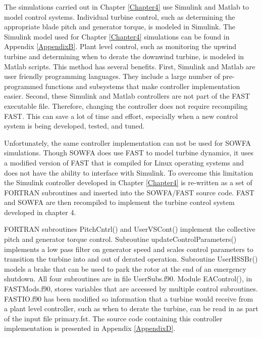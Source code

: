 The simulations carried out in Chapter \ref{Chapter4} use Simulink and Matlab to model control systems. Individual turbine control, such as determining the appropriate blade pitch and generator torque, is modeled in Simulink. The Simulink model used for Chapter \ref{Chapter4} simulations can be found in Appendix \ref{AppendixB}. Plant level control, such as monitoring the upwind turbine and determining when to derate the downwind turbine, is modeled in Matlab scripts. This method has several benefits. First, Simulink and Matlab are user friendly programming languages.  They include a large number of pre-programmed functions and subsystems that make controller implementation easier. Second, these Simulink and Matlab controllers are not part of the FAST executable file. Therefore, changing the controller does not require recompiling FAST. This can save a lot of time and effort, especially when a new control system is being developed, tested, and tuned. 

Unfortunately, the same controller implementation can not be used for SOWFA simulations. Though SOWFA does use FAST to model turbine dynamics, it uses a modified version of FAST that is compiled for Linux operating systems and does not have the ability to interface with Simulink. To overcome this limitation the Simulink controller developed in Chapter \ref{Chapter4} is re-written as a set of FORTRAN subroutines and inserted into the SOWFA/FAST source code. FAST and SOWFA are then recompiled to implement the turbine control system developed in chapter 4. 

FORTRAN subroutines PitchCntrl() and UserVSCont() implement the collective pitch and generator torque control. Subroutine updateControlParameters() implements a low pass filter on generator speed and scales control parameters to transition the turbine into and out of derated operation. Subroutine UserHSSBr() models a brake that can be used to park the rotor at the end of an emergency shutdown. All four subroutines are in file UserSubs.f90. Module EAControl(), in FAST\textunderscore Mods.f90, stores variables that are accessed by multiple control subroutines. FAST\textunderscore IO.f90 has been modified so information that a turbine would receive from a plant level controller, such as when to derate the turbine, can be read in as part of the input file primary.fst. The source code containing this controller implementation is presented in Appendix \ref{AppendixD}.   

